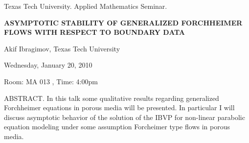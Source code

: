\documentclass[oneside]{amsart}
\newcommand{\talktitle}{\uppercase{Asymptotic Stability of Generalized Forchheimer Flows with respect to Boundary Data}}
\newcommand{\talkspeaker}{Akif Ibragimov, Texas Tech University}
\newcommand{\talkdate}{Wednesday, January 20, 2010}
\newcommand{\talkabstract}{In this talk some qualitative results regarding generalized Forchheimer equations in porous media will be presented. In particular I will discuss asymptotic behavior of the solution of the IBVP for non-linear parabolic equation modeling under some assumption Forcheimer type flows in porous media.
}
\begin{document}
\thispagestyle{empty}

\begin{center}
Texas Tech University.  Applied Mathematics Seminar.

\end{center}

\begin{center}

\textbf{\LARGE \talktitle}

\talkspeaker

\talkdate

Room: MA 013 , Time: 4:00pm

\end{center}

ABSTRACT.
\talkabstract
\end{document}
